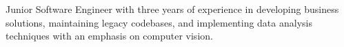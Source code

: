 
Junior Software Engineer with three years of experience in developing business solutions, maintaining legacy codebases, and implementing data analysis techniques with an emphasis on computer vision.
